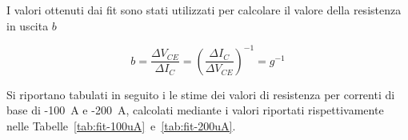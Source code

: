 \documentclass[../main.tex]{subfiles}
\begin{document}


    I valori ottenuti dai fit sono stati utilizzati per calcolare
    il valore della resistenza in uscita $b$

    \begin{equation*}
        b = \frac{\varDelta V_{CE}}{\varDelta I_C} =
        \left( \frac{\varDelta I_C}{\varDelta V_{CE}} \right)^{-1} = g^{-1}
    \end{equation*}

    Si riportano tabulati in seguito i le stime dei valori di resistenza
    per correnti di base di -100~\textmu A e -200~\textmu A, calcolati mediante
    i valori riportati rispettivamente nelle
    Tabelle~\ref{tab:fit-100uA}~e~\ref{tab:fit-200uA}.
\end{document}
